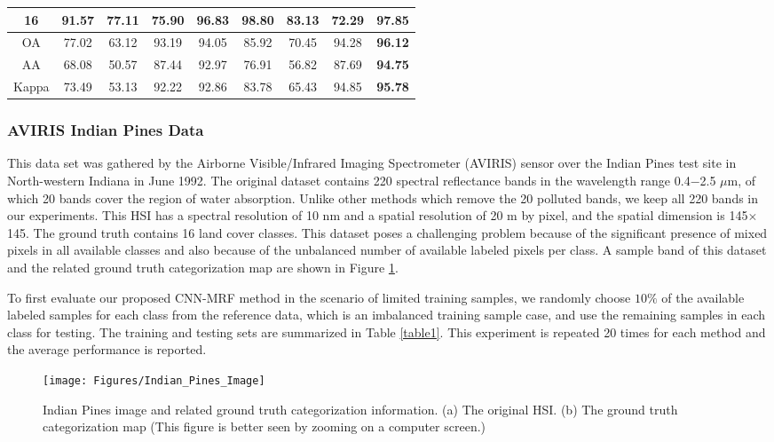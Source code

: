 \documentclass[journal]{IEEEtran}
\begin{document}
\begin{table*}[t!]
\begin{center}
{{\begin{tabular}{|c||c|c|c|c|c|c|c|c|}
16	& 91.57 & 77.11 & 75.90 &  96.83 & \bf{98.80} & 83.13  & 72.29 &  97.85 \\ 
							\hline
							OA  & 77.02 & 63.12 & 93.19 &  94.05 & 85.92 & 70.45  & 94.28 &  \bf{96.12}  \\ 
AA	& 68.08 & 50.57 & 87.44 &  92.97 & 76.91 & 56.82  & 87.69 &  \bf{94.75} \\ 
Kappa	& 73.49 & 53.13 & 92.22 &  92.86 & 83.78 & 65.43  & 94.85 &  \bf{95.78} \\ 
							\hline
\end{tabular}
					}
				}
			\end{center}
		\end{table*}	
		
		\subsubsection{AVIRIS Indian Pines Data}
		This data set was gathered by the Airborne Visible/Infrared Imaging Spectrometer (AVIRIS) sensor over the Indian Pines test site in North-western Indiana in June 1992. The original dataset contains 220 spectral reflectance bands in the wavelength range 0.4$-$2.5 {{$\mu$m}}, of which 20 bands cover the region of water absorption. Unlike other methods which remove the 20 polluted bands, we keep all 220 bands in our experiments. This HSI has a spectral resolution of 10 {{nm}} and a spatial resolution of 20 {{m}} by pixel, and the spatial dimension is 145$\times$145. The ground truth contains 16 land cover classes. This dataset poses a challenging problem because of the significant presence of mixed pixels in all available classes and also because of the unbalanced number of available labeled pixels per class. A sample band of this dataset and the related ground truth categorization map are shown in Figure \ref{indianpines_Image}. 
		
		To first evaluate our proposed CNN-MRF method in the scenario of limited training samples, we randomly choose $10\%$ of the available labeled samples for each class from the reference data, which is an imbalanced training sample case, and use the remaining samples in each class for testing. The training and testing sets are summarized in Table \ref{table1}. This experiment is repeated 20 times for each method and the average performance is reported. 
		
		\begin{figure}
			\centering
			\texttt{[image: Figures/Indian\_Pines\_Image]}
			\caption{{{Indian Pines image and related ground truth categorization information. (a) The original HSI. (b) The ground truth categorization map (This figure is better seen by zooming on a computer screen.)}}}\label{indianpines_Image}
		\end{figure}	
		
\end{document}
